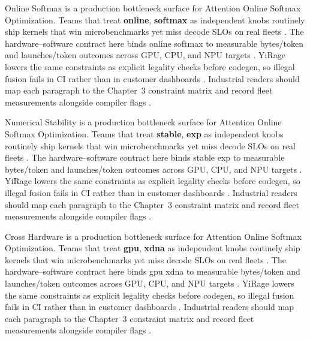 Online Softmax is a production bottleneck surface for Attention Online Softmax Optimization. Teams that treat \textbf{online}, \textbf{softmax} as independent knobs routinely ship kernels that win microbenchmarks yet miss decode SLOs on real fleets \citep{nvidia2024cudagraphs,taxbreak2026}. The hardware--software contract here binds online softmax to measurable bytes/token and launches/token outcomes across GPU, CPU, and NPU targets \citep{liu2024deepseekv3,memoryfloor2026}. YiRage lowers the same constraints as explicit legality checks before codegen, so illegal fusion fails in CI rather than in customer dashboards \citep{patel2025llminference,nvidia2022hopper}. Industrial readers should map each paragraph to the Chapter~3 constraint matrix and record fleet measurements alongside compiler flags \citep{taxbreak2026,semianalysis2024tma}.

Numerical Stability is a production bottleneck surface for Attention Online Softmax Optimization. Teams that treat \textbf{stable}, \textbf{exp} as independent knobs routinely ship kernels that win microbenchmarks yet miss decode SLOs on real fleets \citep{liu2024deepseekv3,memoryfloor2026}. The hardware--software contract here binds stable exp to measurable bytes/token and launches/token outcomes across GPU, CPU, and NPU targets \citep{patel2025llminference,nvidia2022hopper}. YiRage lowers the same constraints as explicit legality checks before codegen, so illegal fusion fails in CI rather than in customer dashboards \citep{taxbreak2026,semianalysis2024tma}. Industrial readers should map each paragraph to the Chapter~3 constraint matrix and record fleet measurements alongside compiler flags \citep{memoryfloor2026,amd2024xdna}.

Cross Hardware is a production bottleneck surface for Attention Online Softmax Optimization. Teams that treat \textbf{gpu}, \textbf{xdna} as independent knobs routinely ship kernels that win microbenchmarks yet miss decode SLOs on real fleets \citep{patel2025llminference,nvidia2022hopper}. The hardware--software contract here binds gpu xdna to measurable bytes/token and launches/token outcomes across GPU, CPU, and NPU targets \citep{taxbreak2026,semianalysis2024tma}. YiRage lowers the same constraints as explicit legality checks before codegen, so illegal fusion fails in CI rather than in customer dashboards \citep{memoryfloor2026,amd2024xdna}. Industrial readers should map each paragraph to the Chapter~3 constraint matrix and record fleet measurements alongside compiler flags \citep{nvidia2022hopper,amd2024aie}.

